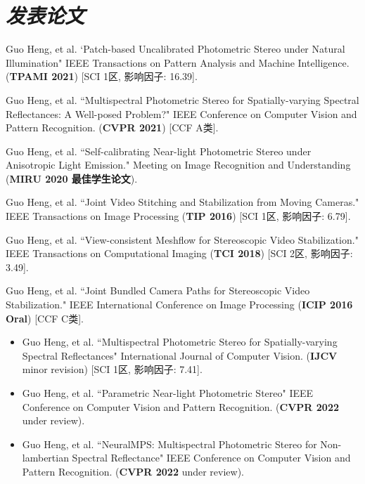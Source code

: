 \documentclass[UTF8]{ctexart}
\begin{document}
	\section{\textit{\textbf{发表论文}}}
	\begin{enumerate}[label={[\arabic*]}]
		\item Guo Heng, et al. `Patch-based Uncalibrated Photometric Stereo under Natural Illumination" 
		IEEE Transactions on Pattern Analysis and Machine Intelligence. (\textbf{TPAMI 2021}) [SCI 1区, 影响因子: 16.39]. 
		\item Guo Heng, et al. ``Multispectral Photometric Stereo for Spatially-varying Spectral Reflectances: A Well-posed Problem?" IEEE Conference on Computer Vision and Pattern Recognition. (\textbf{CVPR 2021}) [CCF A类]. 
		\item Guo Heng, et al. ``Self-calibrating Near-light Photometric Stereo under Anisotropic Light Emission." Meeting on Image Recognition and Understanding (\textbf{MIRU 2020 最佳学生论文}).  
		\item Guo Heng, et al. ``Joint Video Stitching and Stabilization from Moving Cameras." IEEE Transactions on Image Processing (\textbf{TIP 2016}) [SCI 1区, 影响因子: 6.79].
		\item Guo Heng, et al. ``View-consistent Meshflow for Stereoscopic Video Stabilization." IEEE Transactions on Computational Imaging (\textbf{TCI 2018}) [SCI 2区, 影响因子: 3.49].
		\item Guo Heng, et al. ``Joint Bundled Camera Paths for Stereoscopic Video Stabilization." IEEE International Conference on Image Processing (\textbf{ICIP 2016 Oral}) [CCF C类].
	\end{enumerate}
	\begin{itemize}[label={[*]}]
		\item Guo Heng, et al. ``Multispectral Photometric Stereo for Spatially-varying Spectral Reflectances" International Journal of Computer Vision. (\textbf{IJCV} minor revision) [SCI 1区, 影响因子: 7.41]. 
		\item Guo Heng, et al. ``Parametric Near-light Photometric Stereo" IEEE Conference on Computer Vision and Pattern Recognition. (\textbf{CVPR 2022} under review). 
		\item Guo Heng, et al. ``NeuralMPS: Multispectral Photometric Stereo for Non-lambertian Spectral Reflectance" IEEE Conference on Computer Vision and Pattern Recognition. (\textbf{CVPR 2022} under review). 
	\end{itemize}
\end{document}
